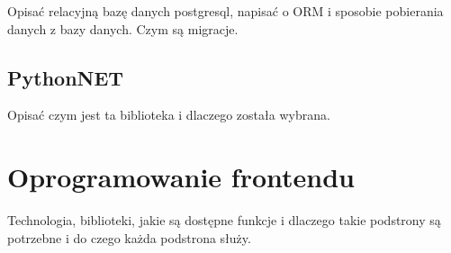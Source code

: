 Opisać relacyjną bazę danych postgresql, napisać o ORM i sposobie pobierania danych z bazy danych. Czym są migracje.


\subsection{PythonNET}
\label{sec:pythonNet}

Opisać czym jest ta biblioteka i dlaczego została wybrana.


\section{Oprogramowanie frontendu}
\label{sec:oprogramowanieFrontendu}

Technologia, biblioteki, jakie są dostępne funkcje i dlaczego takie podstrony są potrzebne i do czego każda podstrona służy.
